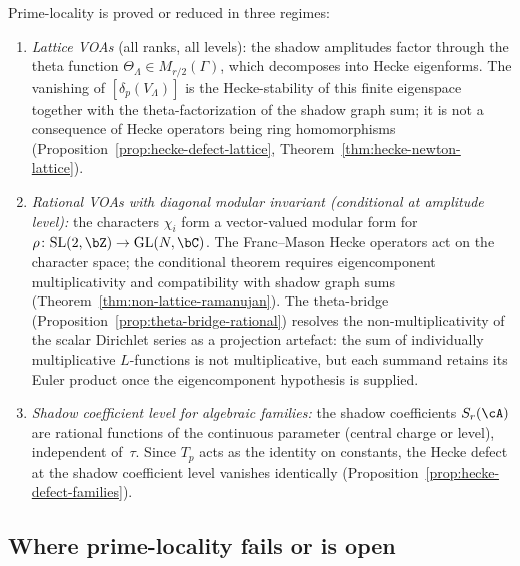 \begin{proposition}%
\label{prop:prime-locality-settled-reduced-cases}%
Prime-locality is proved or reduced in three regimes:
\begin{enumerate}[label=\textup{(\roman*)}]
\item \emph{Lattice VOAs} \textup{(}all ranks, all levels\textup{):}
 the shadow amplitudes factor through the theta function
 $\Theta_\Lambda \in M_{r/2}(\Gamma)$, which decomposes
 into Hecke eigenforms. The vanishing of
 $[\delta_p(V_\Lambda)]$ is the Hecke-stability of this finite
 eigenspace together with the theta-factorization of the shadow
 graph sum; it is not a consequence of Hecke operators being ring
 homomorphisms
 \textup{(}Proposition~\textup{\ref{prop:hecke-defect-lattice}},
 Theorem~\textup{\ref{thm:hecke-newton-lattice}}\textup{)}.

\item \emph{Rational VOAs with diagonal modular invariant
\textup{(}conditional at amplitude level\textup{):}}
 the characters $\chi_i$ form a vector-valued modular form
 for $\rho\colon \mathrm{SL}(2,\bZ) \to \mathrm{GL}(N,\bC)$.
 The Franc--Mason Hecke operators act on the character space; the
 conditional theorem requires eigencomponent multiplicativity and
 compatibility with shadow graph sums
 \textup{(}Theorem~\textup{\ref{thm:non-lattice-ramanujan}}\textup{)}.
 The theta-bridge
 \textup{(}Proposition~\textup{\ref{prop:theta-bridge-rational}}\textup{)}
 resolves the non-multiplicativity of the scalar Dirichlet
 series as a projection artefact: the sum of individually
 multiplicative $L$-functions is not multiplicative, but each
 summand retains its Euler product once the eigencomponent
 hypothesis is supplied.

\item \emph{Shadow coefficient level for algebraic families:}
 the shadow coefficients $S_r(\cA)$ are rational functions of
 the continuous parameter \textup{(}central charge or level\textup{)},
 independent of~$\tau$. Since $T_p$ acts as the identity on
 constants, the Hecke defect at the shadow coefficient level
 vanishes identically
 \textup{(}Proposition~\textup{\ref{prop:hecke-defect-families}}\textup{)}.
\end{enumerate}
\end{proposition}

\subsection{Where prime-locality fails or is open}

